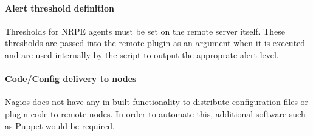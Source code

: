 \documentclass[10pt]{article}
\begin{document}
	\paragraph{Alert threshold definition}
	Thresholds for NRPE agents must be set on the remote server itself.  These thresholds are passed
	into the remote plugin as an argument when it is executed and are used internally by the script to
	output the approprate alert level.
	
	\paragraph{Code/Config delivery to nodes}
	Nagios does not have any in built functionality to distribute configuration files or plugin code to
	remote nodes. In order to automate this, additional software such as Puppet would be required.
\end{document}
